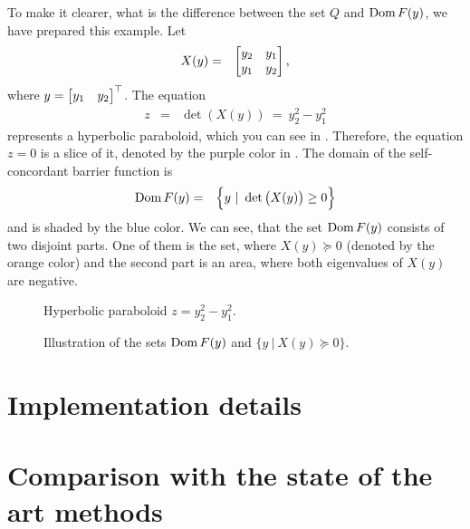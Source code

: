 \begin{example}
  To make it clearer, what is the difference between the set $Q$ and $\operatorname{Dom} F(y)$, we have prepared this example. Let
  \begin{eqnarray}
    X(y) &=& \begin{bmatrix} y_2 & y_1 \\ y_1 & y_2 \end{bmatrix},
  \end{eqnarray}
  where $y = \begin{bmatrix} y_1 & y_2 \end{bmatrix}^\top$. The equation
  \begin{eqnarray}
    z &=& \det(X(y))\ =\ y_2^2 - y_1^2
  \end{eqnarray}
  represents a hyperbolic paraboloid, which you can see in .
  Therefore, the equation $z = 0$ is a slice of it, denoted by the purple color in . The domain of the self-concordant barrier function is
 \begin{eqnarray}
   \operatorname{Dom} F(y) &=& \Big\{y\ |\ \det\big(X(y)\big) \geq 0\Big\}
 \end{eqnarray}
 and is shaded by the blue color. 
 We can see, that the set $\operatorname{Dom} F(y)$ consists of two disjoint parts. One of them is the set, where $X(y)\succeq0$ (denoted by the orange color) and the second part is an area, where both eigenvalues of $X(y)$ are negative.

  \begin{figure}[ht]
    \centering
    \resizebox{0.95\textwidth}{!}{}
    \caption{Hyperbolic paraboloid $z = y_2^2 - y_1^2$.}
  \end{figure}

  \begin{figure}[ht]
    \centering
    \resizebox{0.95\textwidth}{!}{}
    \caption{Illustration of the sets $\operatorname{Dom} F(y)$ and $\big\{y\ |\ X(y) \succeq 0\big\}$.}
  \end{figure}
\end{example}


\section{Implementation details}

\section{Comparison with the state of the art methods}


